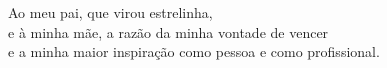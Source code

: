 \begin{dedicatoria}
\begin{flushright}
Ao meu pai, que virou estrelinha,\\
e à minha mãe, a razão da minha vontade de vencer\\
e a minha maior inspiração como pessoa e como profissional.
\end{flushright}
\end{dedicatoria}
